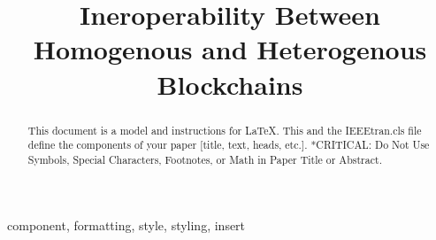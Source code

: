 \documentclass[conference]{IEEEtran}
\begin{document}
\title{Ineroperability Between Homogenous and Heterogenous Blockchains\\


}

\author{
}

\maketitle

\begin{abstract}
This document is a model and instructions for \LaTeX.
This and the IEEEtran.cls file define the components of your paper [title, text, heads, etc.]. *CRITICAL: Do Not Use Symbols, Special Characters, Footnotes, 
or Math in Paper Title or Abstract.
\end{abstract}

\begin{IEEEkeywords}
component, formatting, style, styling, insert
\end{IEEEkeywords}
\end{document}
